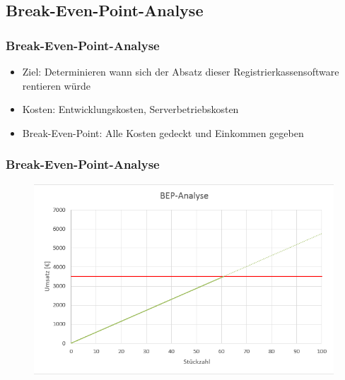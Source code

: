 \subsection{Break-Even-Point-Analyse}
\begin{frame}
\frametitle{Break-Even-Point-Analyse}
\begin{itemize}
\item Ziel: Determinieren wann sich der Absatz dieser Registrierkassensoftware rentieren würde
\item Kosten: Entwicklungskosten, Serverbetriebskosten
\item Break-Even-Point: Alle Kosten gedeckt und Einkommen gegeben
\end{itemize}
\end{frame}
\begin{frame}
\frametitle{Break-Even-Point-Analyse}
\begin{figure}
\includegraphics[scale=0.45]{BEP}
\end{figure}
\end{frame}

